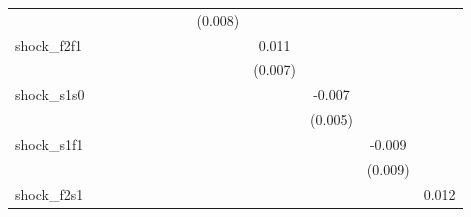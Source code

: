 {\begin{tabular}{l*{12}{c}}
            &                     &                     &                     &                     &                     &                     &                     &     (0.008)         &                     &                     &                     &                     \\
\addlinespace
shock\_f2f1  &                     &                     &                     &                     &                     &                     &                     &                     &       0.011         &                     &                     &                     \\
            &                     &                     &                     &                     &                     &                     &                     &                     &     (0.007)         &                     &                     &                     \\
\addlinespace
shock\_s1s0  &                     &                     &                     &                     &                     &                     &                     &                     &                     &      -0.007         &                     &                     \\
            &                     &                     &                     &                     &                     &                     &                     &                     &                     &     (0.005)         &                     &                     \\
\addlinespace
shock\_s1f1  &                     &                     &                     &                     &                     &                     &                     &                     &                     &                     &      -0.009         &                     \\
            &                     &                     &                     &                     &                     &                     &                     &                     &                     &                     &     (0.009)         &                     \\
\addlinespace
shock\_f2s1  &                     &                     &                     &                     &                     &                     &                     &                     &                     &                     &                     &       0.012\sym{*}  \\

\end{tabular}}
